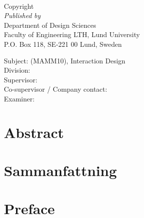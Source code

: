 \documentclass[a4paper,11pt]{article}
\newcounter{counterTODO}\setcounter{counterTODO}{1}
\newcommand\TODO[2][]{%
  \ifshowTodo{%
    \def\varTODOtext{\textcolor{purple}{\texttt{<}\textbf{TODO}\#\arabic{counterTODO}\texttt{: #2>}}}
    \def\varTODOContentLine{\textcolor{purple}{#2}}
    \ifthenelse{\isempty{#1}}%
      {%
        \addcontentsline{tocTODO}{section}{\vspace{-0.3cm}\varTODOContentLine}%
        \varTODOtext\\%
      }%
      {%
        \addcontentsline{tocTODO}{section}{\vspace{-0.3cm}\sout{\varTODOContentLine}}%
      }%
      \stepcounter{counterTODO}%
  }\fi%
}
\newif\ifshowTodo
\begin{document}


\newpage

{\Large \titleFull}
\vspace{1.5cm} \\
\begin{large}
  Copyright \textcopyright \ \the\year \ \name \\

  \textit{Published by} \vspace{0.2cm} \\
      Department of Design Sciences \\
      Faculty of Engineering LTH, Lund University \\
      P.O. Box 118, SE-221 00 Lund, Sweden

  \vspace{0.8cm}
  Subject: (MAMM10), Interaction Design \\
  Division: \division \\
  Supervisor: \supervisor \\
  \TODO[]{Co-supervisor or Company contact?}
  Co-supervisor / Company contact: \contact \\
  Examiner: \examiner \\


\end{large}

\newpage


\section*{Abstract}

\TODO[]{Write non-mock abstract}
\def\abs{}
{\abs}


\newpage

\section*{Sammanfattning}

\TODO[]{Complete English version \& translate to Swedish}
{\abs}

\newpage

\section*{Preface}

\TODO[]{Finish preface}
\end{document}
